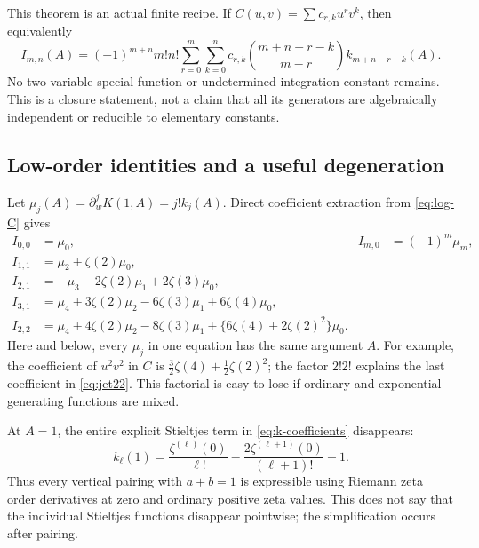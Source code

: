 \documentclass[11pt,a4paper]{article}
\theoremstyle{definition}
\numberwithin{equation}{section}
\begin{document}
This theorem is an actual finite recipe. If
$C(u,v)=\sum c_{r,k}u^rv^k$, then equivalently
\begin{equation}\label{eq:finite-jet-recipe}
 I_{m,n}(A)=(-1)^{m+n}m!n!
  \sum_{r=0}^m\sum_{k=0}^n c_{r,k}
       \binom{m+n-r-k}{m-r}k_{m+n-r-k}(A).
\end{equation}
No two-variable special function or undetermined integration constant
remains. This is a closure statement, not a claim that all its generators
are algebraically independent or reducible to elementary constants.

\subsection{Low-order identities and a useful degeneration}
Let $\mu_j(A)=\partial_w^jK(1,A)=j!k_j(A)$. Direct coefficient extraction
from \eqref{eq:log-C} gives
\begin{align}
 I_{0,0}&=\mu_0,&
 I_{m,0}&=(-1)^m\mu_m,\label{eq:jet-row0}\\
 I_{1,1}&=\mu_2+\zeta(2)\mu_0,\label{eq:jet11}\\
 I_{2,1}&=-\mu_3-2\zeta(2)\mu_1+2\zeta(3)\mu_0,\label{eq:jet21}\\
 I_{3,1}&=\mu_4+3\zeta(2)\mu_2-6\zeta(3)\mu_1
                   +6\zeta(4)\mu_0,\label{eq:jet31}\\
 I_{2,2}&=\mu_4+4\zeta(2)\mu_2-8\zeta(3)\mu_1
                   +\{6\zeta(4)+2\zeta(2)^2\}\mu_0.
                   \label{eq:jet22}
\end{align}
Here and below, every $\mu_j$ in one equation has the same argument $A$.
For example, the coefficient of $u^2v^2$ in $C$ is
$\frac32\zeta(4)+\frac12\zeta(2)^2$; the factor $2!2!$ explains the last
coefficient in \eqref{eq:jet22}. This factorial is easy to lose if ordinary
and exponential generating functions are mixed.

At $A=1$, the entire explicit Stieltjes term in
\eqref{eq:k-coefficients} disappears:
\begin{equation}\label{eq:A-one-degeneration}
 k_\ell(1)=\frac{\zeta^{(\ell)}(0)}{\ell!}
          -\frac{2\zeta^{(\ell+1)}(0)}{(\ell+1)!}-1.
\end{equation}
Thus every vertical pairing with $a+b=1$ is expressible using Riemann zeta
order derivatives at zero and ordinary positive zeta values. This does
not say that the individual Stieltjes functions disappear pointwise;
the simplification occurs after pairing.
\end{document}
